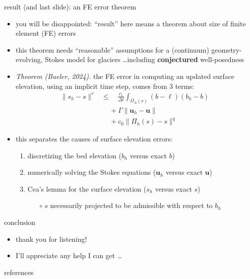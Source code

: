 \documentclass[10pt,dvipsnames]{beamer}
\newcommand{\bu}{\mathbf{u}}
\begin{document}
\begin{frame}{result (and last slide): an FE error theorem}

\begin{itemize}
\item you will be disappointed: ``result'' here means a theorem about size of finite element (FE) errors
\item this theorem needs ``reasonable'' assumptions for a (continuum) geometry-evolving, Stokes model for glaciers \dots including \textbf{conjectured} well-posedness
\item \emph{Theorem (Bueler, 2024).}  the FE error in computing an updated surface elevation, using an implicit time step, comes from 3 terms:
\begin{align*}
\|s_h-s\|^r &\le \quad \frac{c_1}{\Delta t} \int_{\Omega_A(s)} (b - \ell) (b_h - b) \\
   &\quad\, + \Gamma \big\|\bu_h - \bu\big\| \\
   &\quad\, + c_0 \|\Pi_h(s) - s\|^q
\end{align*}
\item this separates the causes of surface elevation errors:
    \begin{enumerate}
    \item discretizing the bed elevation ($b_h$ versus exact $b$)
    \item numerically solving the Stokes equations ($\bu_h$ versus exact $\bu$)
    \item Cea's lemma for the surface elevation ($s_h$ versus exact $s$) \strut
        \begin{itemize}
        \item[$\circ$] $s$ necessarily projected to be admissible with respect to $b_h$
        \end{itemize}
    \end{enumerate}
\end{itemize}
\end{frame}


\begin{frame}{conclusion}

\begin{itemize}
\item thank you for listening!
\item I'll appreciate any help I can get \dots
\end{itemize}
\end{frame}


\begin{frame}{references}

{\footnotesize }
\end{frame}
\end{document}
